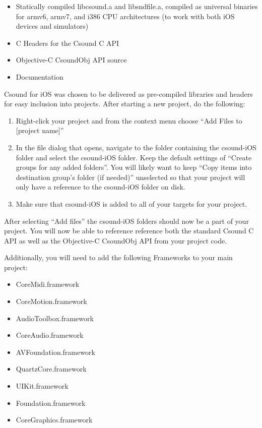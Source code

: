 \documentclass[11pt]{article}
\begin{document}
\begin{itemize}
\item Statically compiled libcsound.a and libsndfile.a, compiled as universal binaries for armv6, armv7, and i386 CPU architectures (to work with both iOS devices and simulators)
\item C Headers for the Csound C API
\item Objective-C CsoundObj API source
\item Documentation
\end{itemize} 

Csound for iOS was chosen to be delivered as pre-compiled libraries and headers for easy inclusion into projects.  After starting a new project, do the following:

\begin{enumerate}
\item Right-click your project and from the context menu choose ``Add Files to [project name]''
\item In the file dialog that opens, navigate to the folder containing the csound-iOS folder and select the csound-iOS folder. Keep the default settings of ``Create groups for any added folders''.  You will likely want to keep ``Copy items into destination group's folder (if needed)'' unselected so that your project will only have a reference to the csound-iOS folder on disk.
\item Make sure that csound-iOS is added to all of your targets for your project.
\end{enumerate}

After selecting ``Add files'' the csound-iOS folders should now be a part of your project.  You will now be able to reference reference both the standard Csound C API as well as the Objective-C CsoundObj API from your project code.

Additionally, you will need to add the following Frameworks to your main project:

\begin{itemize}
  \item CoreMidi.framework 
  \item CoreMotion.framework 
  \item AudioToolbox.framework 
  \item CoreAudio.framework 
  \item AVFoundation.framework 
  \item QuartzCore.framework 
  \item UIKit.framework 
  \item Foundation.framework 
  \item CoreGraphics.framework 
\end{itemize}
\end{document}
